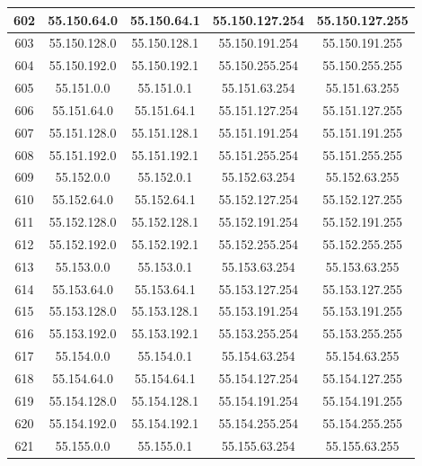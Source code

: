 \documentclass[letterpaper,12pt]{article}
\begin{document}
\begin{center}
\begin{longtable}{|c|c|c|c|c|}
                602 & 55.150.64.0 & 55.150.64.1 & 55.150.127.254 & 55.150.127.255 \\ \hline
                603 & 55.150.128.0 & 55.150.128.1 & 55.150.191.254 & 55.150.191.255 \\ \hline
                604 & 55.150.192.0 & 55.150.192.1 & 55.150.255.254 & 55.150.255.255 \\ \hline
                605 & 55.151.0.0 & 55.151.0.1 & 55.151.63.254 & 55.151.63.255 \\ \hline
                606 & 55.151.64.0 & 55.151.64.1 & 55.151.127.254 & 55.151.127.255 \\ \hline
                607 & 55.151.128.0 & 55.151.128.1 & 55.151.191.254 & 55.151.191.255 \\ \hline
                608 & 55.151.192.0 & 55.151.192.1 & 55.151.255.254 & 55.151.255.255 \\ \hline
                609 & 55.152.0.0 & 55.152.0.1 & 55.152.63.254 & 55.152.63.255 \\ \hline
                610 & 55.152.64.0 & 55.152.64.1 & 55.152.127.254 & 55.152.127.255 \\ \hline
                611 & 55.152.128.0 & 55.152.128.1 & 55.152.191.254 & 55.152.191.255 \\ \hline
                612 & 55.152.192.0 & 55.152.192.1 & 55.152.255.254 & 55.152.255.255 \\ \hline
                613 & 55.153.0.0 & 55.153.0.1 & 55.153.63.254 & 55.153.63.255 \\ \hline
                614 & 55.153.64.0 & 55.153.64.1 & 55.153.127.254 & 55.153.127.255 \\ \hline
                615 & 55.153.128.0 & 55.153.128.1 & 55.153.191.254 & 55.153.191.255 \\ \hline
                616 & 55.153.192.0 & 55.153.192.1 & 55.153.255.254 & 55.153.255.255 \\ \hline
                617 & 55.154.0.0 & 55.154.0.1 & 55.154.63.254 & 55.154.63.255 \\ \hline
                618 & 55.154.64.0 & 55.154.64.1 & 55.154.127.254 & 55.154.127.255 \\ \hline
                619 & 55.154.128.0 & 55.154.128.1 & 55.154.191.254 & 55.154.191.255 \\ \hline
                620 & 55.154.192.0 & 55.154.192.1 & 55.154.255.254 & 55.154.255.255 \\ \hline
                621 & 55.155.0.0 & 55.155.0.1 & 55.155.63.254 & 55.155.63.255 \\ \hline

\end{longtable}
\end{center}
\end{document}

